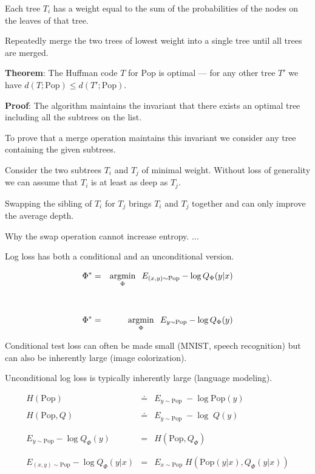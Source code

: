 {\vfill
Each tree $T_i$ has a weight equal to the sum of the probabilities of the nodes on the leaves of that tree.

\vfill
Repeatedly merge the two trees of lowest weight into a single tree until all trees are merged.


{\bf Theorem}: The Huffman code $T$ for $\mathrm{Pop}$ is optimal --- for any other tree $T'$ we have $d(T;\mathrm{Pop}) \leq d(T';\mathrm{Pop})$.

\vfill
{\bf Proof}: The algorithm maintains the invariant that there exists an optimal tree including
all the subtrees on the list.

\vfill
To prove that a merge operation maintains this invariant we consider any tree containing the given subtrees.

\vfill
Consider the two subtrees $T_i$ and $T_j$ of minimal weight.  Without loss of generality we can assume that $T_i$ is at least as deep as $T_j$.

\vfill
Swapping the sibling of $T_i$ for $T_j$ brings $T_i$ and $T_j$ together and can only improve the average depth.


Why the swap operation cannot increase entropy. ...


Log loss has both a conditional and an unconditional version.

\vfill
\begin{eqnarray*}
  \Phi^* & = & \operatorname*{argmin}_\Phi \;\;E_{(x,y) \sim \mathrm{Pop}}  -\log Q_\Phi(y|x) \\
  \\
  \\
  \Phi^* & = & \operatorname*{argmin}_\Phi \;\;E_{y \sim \mathrm{Pop}}  -\log Q_\Phi(y)
\end{eqnarray*}

Conditional test loss can often be made small (MNIST, speech recognition) but can also be inherently large (image colorization).

\vfill
Unconditional log loss is typically inherently large (language modeling).

\vfill
{}


\begin{eqnarray*}
  H(\mathrm{Pop}) & \doteq & E_{y \sim \mathrm{Pop}}\;- \log \mathrm{Pop}(y) \\
  \\
  H(\mathrm{Pop},Q) & \doteq & E_{y \sim \mathrm{Pop}}\; -\log\; Q(y) \\
  \\
  \\
  E_{y \sim \mathrm{Pop}} -\log Q_\Phi(y)  & = & H(\mathrm{Pop},Q_\Phi) \\
  \\
  \\
  E_{(x,y) \sim \mathrm{Pop}} -\log Q_\Phi(y|x)  & = & E_{x \sim \mathrm{Pop}} \; H(\mathrm{Pop}(y|x),Q_\Phi(y|x)) \\
\end{eqnarray*}


}
